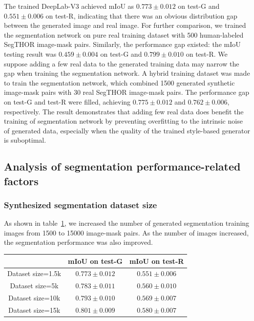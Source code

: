 \documentclass[conference]{IEEEtran}
\begin{document}
The trained DeepLab-V3 achieved mIoU as $0.773\pm 0.012$ on test-G and $0.551\pm 0.006$ on test-R, indicating that there was an obvious distribution gap between the generated image and real image. For further comparison, we trained the segmentation network on pure real training dataset with 500 human-labeled SegTHOR image-mask pairs. Similarly, the performance gap existed: the mIoU testing result was $0.459\pm 0.004$ on test-G and $0.799\pm 0.010$ on test-R. 
We suppose adding a few real data to the generated training data may narrow the gap when training the segmentation network. A hybrid training dataset was made to train the segmentation network, which combined 1500 generated synthetic image-mask pairs with 30 real SegTHOR image-mask pairs. The performance gap on test-G and test-R were filled, achieving $0.775\pm 0.012$ and $0.762\pm 0.006$, respectively. 
The result demonstrates that adding few real data does benefit the training of segmentation network by preventing overfitting to the intrinsic noise of generated data, especially when the quality of the trained style-based generator is suboptimal. 

\subsection{Analysis of segmentation performance-related factors}
\subsubsection{Synthesized segmentation dataset size} 
As shown in table~\ref{table:abl_seg}, we increased the number of generated segmentation training images from 1500 to 15000 image-mask pairs. As the number of images increased, the segmentation performance was also improved. 

\begin{table}[!h]
  \centering
  \begin{tabular}{c||c|c}
    \hline 
     & mIoU on test-G & mIoU on test-R  \\
    \hline
    Dataset size=1.5k & $0.773\pm 0.012$ & $0.551\pm 0.006$ \\
    Dataset size=5k & $0.783\pm 0.011$ & $0.560\pm 0.010$ \\
    Dataset size=10k & $0.793\pm 0.010$ & $0.569\pm 0.007$ \\
    Dataset size=15k & $\mathbf{0.801\pm 0.009}$ & $\mathbf{0.580\pm 0.007}$ \\
    \hline
  \end{tabular}
  \vspace{0.05cm}
  \label{table:abl_seg}
\end{table}
\end{document}
